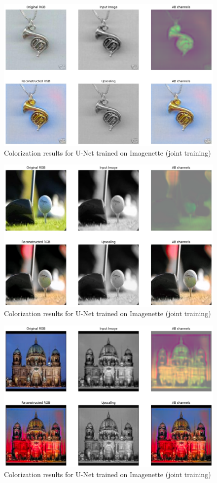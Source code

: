 \documentclass[aspectratio=169]{beamer}
\theoremstyle{definition}
\begin{document}
\begin{frame}
    \begin{figure}
        \centering
        \includegraphics[width=.75\textwidth]{demo-both/cor.png}
        \caption{Colorization results for U-Net trained on Imagenette (joint training)}
    \end{figure}
\end{frame}

\begin{frame}
    \begin{figure}
        \centering
        \includegraphics[width=.75\textwidth]{demo-both/golf.png}
        \caption{Colorization results for U-Net trained on Imagenette (joint training)}
    \end{figure}
\end{frame}

\begin{frame}
    \begin{figure}
        \centering
        \includegraphics[width=.75\textwidth]{demo-both/building.png}
        \caption{Colorization results for U-Net trained on Imagenette (joint training)}
    \end{figure}
\end{frame}
\end{document}
